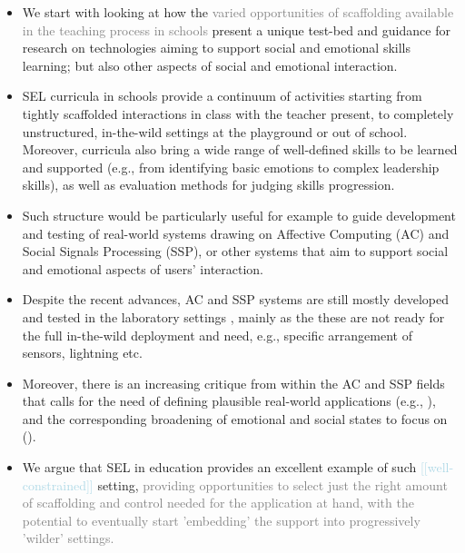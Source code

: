 \documentclass[prodmode,acmtochi]{acmsmall}
\newcommand{\todo}[1]{\textrm{\textrm{\textcolor{LightBlue}{[[#1]]} } } }
\newcommand{\rephrase}[1]{\textrm{\textrm{\textcolor{gray}{#1}}}}
\begin{document}
\begin{itemize}
	\item We start with looking at how the \rephrase{varied opportunities of scaffolding available in the teaching process in schools} present a unique test-bed and guidance for research on technologies aiming to support social and emotional skills learning; but also other aspects of social and emotional interaction.%

	\item SEL curricula in schools provide a continuum of activities starting from tightly scaffolded interactions in class with the teacher present, to completely unstructured, in-the-wild settings at the playground or out of school. Moreover, curricula also bring a wide range of well-defined skills to be learned and supported (e.g., from identifying basic emotions to complex leadership skills), as well as evaluation methods for judging skills progression. \medskip
	
	\item Such structure would be particularly useful for example to guide development and testing of real-world systems drawing on Affective Computing (AC) and Social Signals Processing (SSP), or other systems that aim to support social and emotional aspects of users' interaction.

	\item Despite the recent advances, AC and SSP systems are still mostly developed and tested in the laboratory settings \cite{r,r,r}, mainly as the these are not ready for the full in-the-wild deployment and need, e.g., specific arrangement of sensors, lightning etc. 
	\item Moreover, there is an increasing critique from within the AC and SSP fields that calls for the need of defining plausible real-world applications (e.g., \cite{Pantic2011,Vinciarelli2009}), and the corresponding broadening of emotional and social states to focus on (\cite{Calvo2010a,D'Mello2013}). %
	\medskip

	\item We argue that SEL in education provides an excellent example of such \todo{well-constrained} setting, \rephrase{providing opportunities to select just the right amount of scaffolding and control needed for the application at hand, with the potential to eventually start 'embedding' the support into progressively 'wilder' settings.}


\end{itemize}
\end{document}
